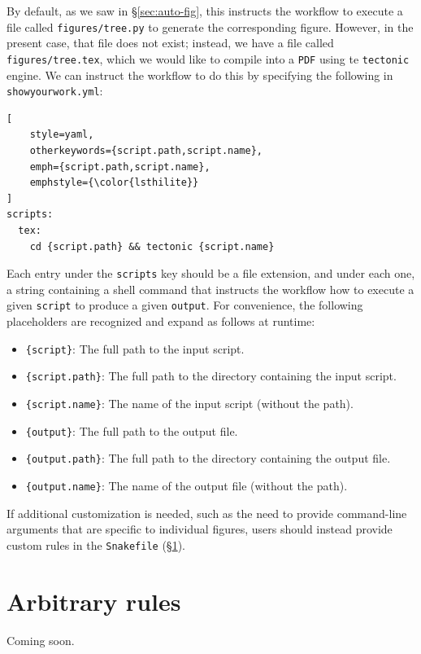 \documentclass[twocolumn]{aastex631}
\begin{document}
\noindent By default, as we saw in \S\ref{sec:auto-fig}, this instructs the workflow to execute a file called \texttt{figures/tree.py} to generate the corresponding figure. 
However, in the present case, that file does not exist; instead, we have a file called \texttt{figures/tree.tex}, which we would like to compile into a \texttt{PDF} using te \texttt{tectonic} engine.
We can instruct the workflow to do this by specifying the following in \texttt{showyourwork.yml}:\\

\noindent\begin{minipage}{\linewidth}
\begin{lstlisting}[
    style=yaml,
    otherkeywords={script.path,script.name},
    emph={script.path,script.name},
    emphstyle={\color{lsthilite}}
]
scripts:
  tex:
    cd {script.path} && tectonic {script.name}
\end{lstlisting}
\end{minipage}

\noindent Each entry under the \texttt{scripts} key should be a file extension, and under each one, a string containing a shell command that instructs the workflow how to execute a given {\color{lsthilite}\texttt{script}} to produce a given {\color{lsthilite}\texttt{output}}.
For convenience, the following placeholders are recognized and expand as follows at runtime:
%
\begin{itemize}
\item \texttt{\{script\}}: The full path to the input script.
\item \texttt{\{script.path\}}: The full path to the directory containing the input script.
\item \texttt{\{script.name\}}: The name of the input script (without the path).
\item \texttt{\{output\}}: The full path to the output file.
\item \texttt{\{output.path\}}: The full path to the directory containing the output file.
\item \texttt{\{output.name\}}: The name of the output file (without the path).
\end{itemize}
%
If additional customization is needed, such as the need to provide command-line arguments that are specific to individual figures, users should instead provide custom rules in the \texttt{Snakefile} (\S\ref{sec:arbitrary-rules}).

\section{Arbitrary rules}
\label{sec:arbitrary-rules}
%
Coming soon.
\end{document}
